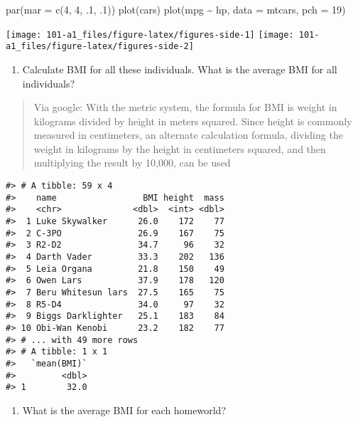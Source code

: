 \documentclass[
]{book}
\newenvironment{Shaded}{\begin{snugshade}}{\end{snugshade}}
\newcommand{\AttributeTok}[1]{\textcolor[rgb]{0.77,0.63,0.00}{#1}}
\newcommand{\DecValTok}[1]{\textcolor[rgb]{0.00,0.00,0.81}{#1}}
\newcommand{\FunctionTok}[1]{\textcolor[rgb]{0.00,0.00,0.00}{#1}}
\newcommand{\NormalTok}[1]{#1}
\newcommand{\SpecialCharTok}[1]{\textcolor[rgb]{0.00,0.00,0.00}{#1}}
\providecommand{\tightlist}{%
  \setlength{\itemsep}{0pt}\setlength{\parskip}{0pt}}
\begin{document}
\begin{Shaded}
\begin{Highlighting}[]
\FunctionTok{par}\NormalTok{(}\AttributeTok{mar =} \FunctionTok{c}\NormalTok{(}\DecValTok{4}\NormalTok{, }\DecValTok{4}\NormalTok{, .}\DecValTok{1}\NormalTok{, .}\DecValTok{1}\NormalTok{))}
\FunctionTok{plot}\NormalTok{(cars)}
\FunctionTok{plot}\NormalTok{(mpg }\SpecialCharTok{\textasciitilde{}}\NormalTok{ hp, }\AttributeTok{data =}\NormalTok{ mtcars, }\AttributeTok{pch =} \DecValTok{19}\NormalTok{)}
\end{Highlighting}
\end{Shaded}

\texttt{[image: 101-a1\_files/figure-latex/figures-side-1]} \texttt{[image: 101-a1\_files/figure-latex/figures-side-2]}

\begin{enumerate}
\def\labelenumi{\arabic{enumi}.}
\setcounter{enumi}{6}
\tightlist
\item
  Calculate BMI for all these individuals. What is the average BMI for all individuals?
\end{enumerate}

\begin{quote}
Via google: With the metric system, the formula for BMI is weight in kilograms divided by height in meters squared. Since height is commonly measured in centimeters, an alternate calculation formula, dividing the weight in kilograms by the height in centimeters squared, and then multiplying the result by 10,000, can be used
\end{quote}

\begin{verbatim}
#> # A tibble: 59 x 4
#>    name                 BMI height  mass
#>    <chr>              <dbl>  <int> <dbl>
#>  1 Luke Skywalker      26.0    172    77
#>  2 C-3PO               26.9    167    75
#>  3 R2-D2               34.7     96    32
#>  4 Darth Vader         33.3    202   136
#>  5 Leia Organa         21.8    150    49
#>  6 Owen Lars           37.9    178   120
#>  7 Beru Whitesun lars  27.5    165    75
#>  8 R5-D4               34.0     97    32
#>  9 Biggs Darklighter   25.1    183    84
#> 10 Obi-Wan Kenobi      23.2    182    77
#> # ... with 49 more rows
#> # A tibble: 1 x 1
#>   `mean(BMI)`
#>         <dbl>
#> 1        32.0
\end{verbatim}

\begin{enumerate}
\def\labelenumi{\arabic{enumi}.}
\setcounter{enumi}{7}
\tightlist
\item
  What is the average BMI for each homeworld?
\end{enumerate}
\end{document}
